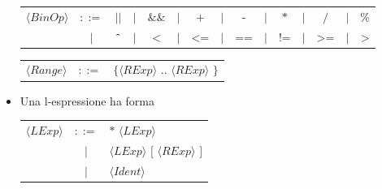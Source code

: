 \documentclass{report}
\newcommand{\nonterm}[1]{\langle #1 \rangle}
\newcommand{\term}[1]{\texttt{#1}}
\begin{document}
\begin{itemize}
        \begin{flushleft}
        \begin{tabular}{*{15}c}
        $\nonterm{BinOp}$   &   $::=$   &   $\term{||}$
                            &    $|$    &   $\term{\&\&}$
                            &    $|$    &   $\term{+}$
                            &    $|$    &   $\term{-}$
                            &    $|$    &   $\term{*}$
                            &    $|$    &   $\term{/}$
                            &    $|$    &   $\term{\%}$         \\
                            &    $|$    &   $\term{\^{}}$
                            &    $|$    &   $\term{<}$
                            &    $|$    &   $\term{<=}$
                            &    $|$    &   $\term{==}$
                            &    $|$    &   $\term{!=}$
                            &    $|$    &   $\term{>=}$
                            &    $|$    &   $\term{>}$

        \end{tabular}
        \end{flushleft}

        \begin{flushleft}
        \begin{tabular}{*{3}c}
        $\nonterm{Range}$   &   $::=$   &   $\term{\{ } \nonterm{RExp} \term{ .. } \nonterm{RExp} \term{ \}}$   

        \end{tabular}
        \end{flushleft}

    \item Una l-espressione ha forma
        \begin{flushleft}
        \begin{tabular}{l c l}
        $\nonterm{LExp}$    &   $::=$   &   $\term{* } \nonterm{LExp}$                                  \\
                            &    $|$    &   $\nonterm{LExp} \term{ [ } \nonterm{RExp} \term{ ]}$        \\
                            &    $|$    &   $\nonterm{Ident}$

        \end{tabular}
        \end{flushleft}


\end{itemize}
\end{document}
